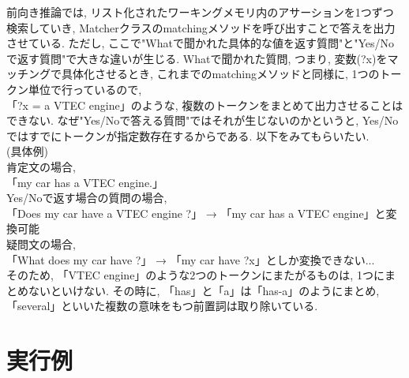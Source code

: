 \documentclass[uplatex,12pt]{jsarticle}
\begin{document}
前向き推論では, リスト化されたワーキングメモリ内のアサーションを1つずつ検索していき, Matcherクラスのmatchingメソッドを呼び出すことで答えを出力させている. ただし, ここで"Whatで聞かれた具体的な値を返す質問"と"Yes/Noで返す質問"で大きな違いが生じる. Whatで聞かれた質問, つまり, 変数(?x)をマッチングで具体化させるとき, これまでのmatchingメソッドと同様に, 1つのトークン単位で行っているので, \\「?x = a VTEC engine」のような, 複数のトークンをまとめて出力させることはできない. なぜ"Yes/Noで答える質問"ではそれが生じないのかというと, Yes/Noではすでにトークンが指定数存在するからである. 以下をみてもらいたい.\\

(具体例)\\
肯定文の場合, \\
「my car has a VTEC engine.」\\
Yes/Noで返す場合の質問の場合,\\ 
「Does my car have a VTEC engine ?」  →  「my car has a VTEC engine」と変換可能\\
疑問文の場合,\\
「What does my car have ?」  →  「my car have ?x」としか変換できない...\\

そのため, 「VTEC engine」のような2つのトークンにまたがるものは, 1つにまとめないといけない. その時に, 「has」と「a」は「has-a」のようにまとめ, 「several」といいた複数の意味をもつ前置詞は取り除いている.

\section{実行例}
\end{document}
